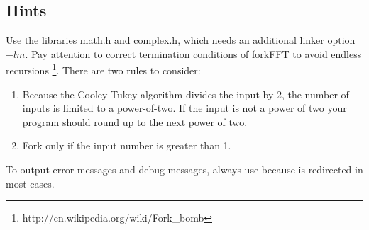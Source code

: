 \subsection*{Hints}
Use the libraries math.h and complex.h, which needs an additional linker option $-lm$.
Pay attention to correct termination conditions of forkFFT to avoid endless recursions \footnote{http://en.wikipedia.org/wiki/Fork\_bomb}.
There are two rules to consider:
\begin{enumerate}
	\item Because the Cooley-Tukey algorithm divides the input by 2, the number of inputs is limited to a power-of-two. If the input is not a power of two your program should round up to the next power of two.
\item Fork only if the input number is greater than 1.
\end{enumerate}

To output error messages and debug messages, always use
 because  is redirected in most cases.

\osueguidelinestwo


